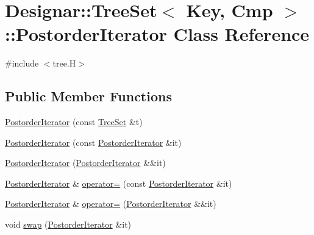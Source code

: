 \hypertarget{class_designar_1_1_tree_set_1_1_postorder_iterator}{}\section{Designar\+:\+:Tree\+Set$<$ Key, Cmp $>$\+:\+:Postorder\+Iterator Class Reference}
\label{class_designar_1_1_tree_set_1_1_postorder_iterator}


{\ttfamily \#include $<$tree.\+H$>$}

\subsection*{Public Member Functions}
\begin{DoxyCompactItemize}
\item 
\hyperlink{class_designar_1_1_tree_set_1_1_postorder_iterator_a9dadd6ef8148a2667500458504478936}{Postorder\+Iterator} (const \hyperlink{class_designar_1_1_tree_set}{Tree\+Set} \&t)
\item 
\hyperlink{class_designar_1_1_tree_set_1_1_postorder_iterator_a19efa5739500f88e268d0dc4cb4eb947}{Postorder\+Iterator} (const \hyperlink{class_designar_1_1_tree_set_1_1_postorder_iterator}{Postorder\+Iterator} \&it)
\item 
\hyperlink{class_designar_1_1_tree_set_1_1_postorder_iterator_a1e347626f3b593f3c1c97ac4080456ac}{Postorder\+Iterator} (\hyperlink{class_designar_1_1_tree_set_1_1_postorder_iterator}{Postorder\+Iterator} \&\&it)
\item 
\hyperlink{class_designar_1_1_tree_set_1_1_postorder_iterator}{Postorder\+Iterator} \& \hyperlink{class_designar_1_1_tree_set_1_1_postorder_iterator_abd8e22b1014d273adda6b8a7ee273db7}{operator=} (const \hyperlink{class_designar_1_1_tree_set_1_1_postorder_iterator}{Postorder\+Iterator} \&it)
\item 
\hyperlink{class_designar_1_1_tree_set_1_1_postorder_iterator}{Postorder\+Iterator} \& \hyperlink{class_designar_1_1_tree_set_1_1_postorder_iterator_ae7babf2b4c789bfb84d7e51dab0356bf}{operator=} (\hyperlink{class_designar_1_1_tree_set_1_1_postorder_iterator}{Postorder\+Iterator} \&\&it)
\item 
void \hyperlink{class_designar_1_1_tree_set_1_1_postorder_iterator_a39439b63a9a8dc8098b6c8359231bbd5}{swap} (\hyperlink{class_designar_1_1_tree_set_1_1_postorder_iterator}{Postorder\+Iterator} \&it)
\item 

\end{DoxyCompactItemize}
